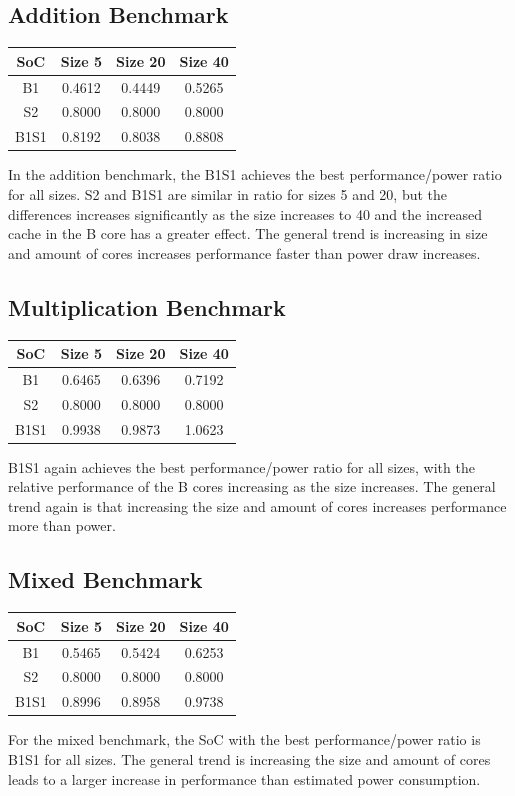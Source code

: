 \subsection{Addition Benchmark}
\begin{center}
\begin{tabular}{c c c c}
    SoC & Size 5 & Size 20 & Size 40 \\
    \hline
    B1 & 0.4612 & 0.4449 & 0.5265 \\
    \hline
    S2 & 0.8000 & 0.8000 & 0.8000 \\
    \hline
    B1S1 & 0.8192 & 0.8038 & 0.8808\\
    \hline
\end{tabular}
\end{center}
In the addition benchmark, the B1S1 achieves the best performance/power ratio for all sizes. S2 and B1S1 are similar in ratio for sizes 5 and 20, but the differences increases significantly as the size increases to 40 and the increased cache in the B core has a greater effect. The general trend is increasing in size and amount of cores increases performance faster than power draw increases.

\subsection{Multiplication Benchmark}
\begin{center}
\begin{tabular}{c c c c}
    SoC & Size 5 & Size 20 & Size 40 \\
    \hline
    B1 & 0.6465 & 0.6396 & 0.7192 \\
    \hline
    S2 & 0.8000 & 0.8000 & 0.8000 \\
    \hline
    B1S1 & 0.9938 & 0.9873 & 1.0623\\
    \hline
\end{tabular}
\end{center}
B1S1 again achieves the best performance/power ratio for all sizes, with the relative performance of the B cores increasing as the size increases. The general trend again is that increasing the size and amount of cores increases performance more than power.

\subsection{Mixed Benchmark}
\begin{center}
\begin{tabular}{c c c c}
    SoC & Size 5 & Size 20 & Size 40 \\
    \hline
    B1 & 0.5465 & 0.5424 & 0.6253 \\
    \hline
    S2 & 0.8000 & 0.8000 & 0.8000 \\
    \hline
    B1S1 & 0.8996 & 0.8958 & 0.9738\\
    \hline
\end{tabular}
\end{center}
For the mixed benchmark, the SoC with the best performance/power ratio is B1S1 for all sizes. The general trend is increasing the size and amount of cores leads to a larger increase in performance than estimated power consumption.

